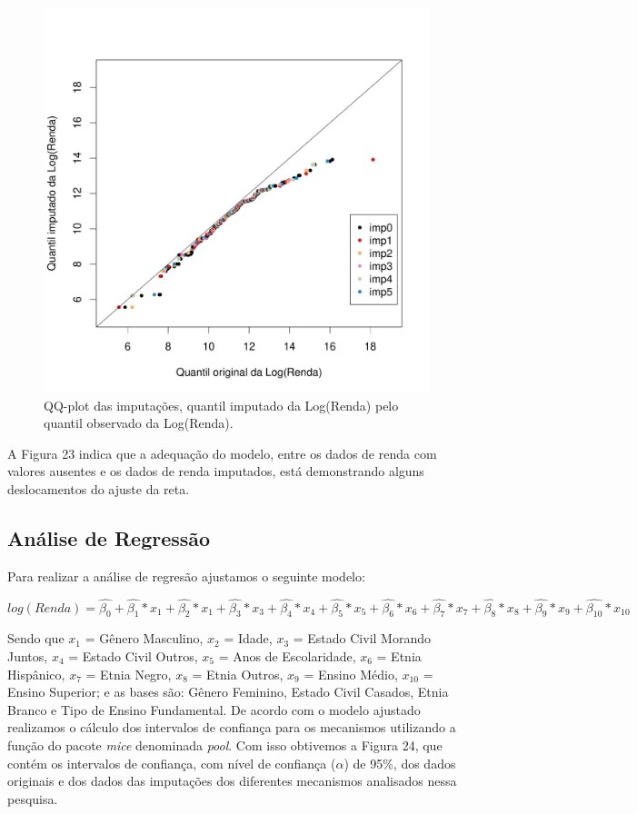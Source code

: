 \documentclass[]{article}
\begin{document}
\begin{figure}[H]

{\centering \includegraphics[width=0.6\linewidth]{p62-graf} 

}

\caption{QQ-plot das imputações, quantil imputado da Log(Renda) pelo quantil observado da Log(Renda).}\label{fig:unnamed-chunk-31}
\end{figure}

A Figura 23 indica que a adequação do modelo, entre os dados de renda
com valores ausentes e os dados de renda imputados, está demonstrando
alguns deslocamentos do ajuste da reta.

\subsection{Análise de Regressão}\label{analise-de-regressao}

Para realizar a análise de regresão ajustamos o seguinte modelo:

\[log(Renda)=\hat{\beta_0}+\hat{\beta_1}*x_1+\hat{\beta_2}*x_1+\hat{\beta_3}*x_3+\hat{\beta_4}*x_4+\hat{\beta_5}*x_5+\hat{\beta_6}*x_6+\hat{\beta_7}*x_7+\hat{\beta_8}*x_8+\hat{\beta_9}*x_9+\hat{\beta_{10}}*x_{10}\]

Sendo que \(x_1\) = Gênero Masculino, \(x_2\) = Idade, \(x_3\) = Estado
Civil Morando Juntos, \(x_4\) = Estado Civil Outros, \(x_5\) = Anos de
Escolaridade, \(x_6\) = Etnia Hispânico, \(x_7\) = Etnia Negro, \(x_8\)
= Etnia Outros, \(x_9\) = Ensino Médio, \(x_{10}\) = Ensino Superior; e
as bases são: Gênero Feminino, Estado Civil Casados, Etnia Branco e Tipo
de Ensino Fundamental. De acordo com o modelo ajustado realizamos o
cálculo dos intervalos de confiança para os mecanismos utilizando a
função do pacote \emph{mice} denominada \emph{pool}. Com isso obtivemos
a Figura 24, que contém os intervalos de confiança, com nível de
confiança (\(\alpha\)) de 95\%, dos dados originais e dos dados das
imputações dos diferentes mecanismos analisados nessa pesquisa.
\end{document}
